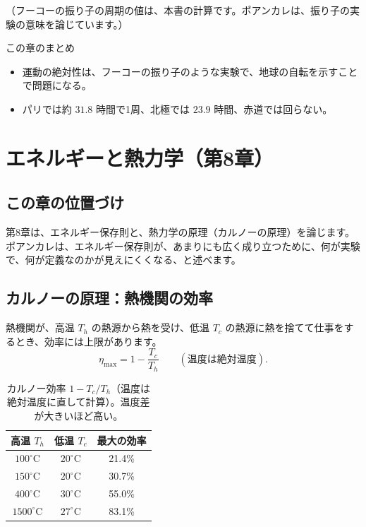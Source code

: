 \documentclass[a4paper,11pt,openany]{ltjsbook}
\begin{document}
（フーコーの振り子の周期の値は、本書の計算です。ポアンカレは、振り子の実験の意味を論じています。）

\begin{pointbox}{この章のまとめ}
\begin{itemize}[leftmargin=*]
\item 運動の絶対性は、フーコーの振り子のような実験で、地球の自転を示すことで問題になる。
\item パリでは約 $31.8$ 時間で1周、北極では $23.9$ 時間、赤道では回らない。
\end{itemize}
\end{pointbox}

\chapter{エネルギーと熱力学（第8章）}

\section{この章の位置づけ}

第8章は、エネルギー保存則と、熱力学の原理（カルノーの原理）を論じます。ポアンカレは、エネルギー保存則が、あまりにも広く成り立つために、何が実験で、何が定義なのかが見えにくくなる、と述べます。

\section{カルノーの原理：熱機関の効率}

熱機関が、高温 $T_h$ の熱源から熱を受け、低温 $T_c$ の熱源に熱を捨てて仕事をするとき、効率には上限があります。
\[
\eta_{\max}=1-\frac{T_c}{T_h}\qquad(\text{温度は絶対温度}).
\]

\begin{table}[htbp]
\centering
\begin{tabular}{cc|c}
\toprule
高温 $T_h$ & 低温 $T_c$ & 最大の効率\\
\midrule
$100^\circ$C & $20^\circ$C & 21.4\%\\
$150^\circ$C & $20^\circ$C & 30.7\%\\
$400^\circ$C & $30^\circ$C & 55.0\%\\
$1500^\circ$C & $27^\circ$C & 83.1\%\\
\bottomrule
\end{tabular}
\caption{カルノー効率 $1-T_c/T_h$（温度は絶対温度に直して計算）。温度差が大きいほど高い。}
\end{table}
\end{document}
